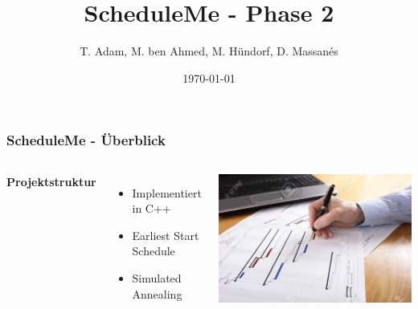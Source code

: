 \documentclass[aspectratio=169]{beamer}
\title[ScheduleMe]{ScheduleMe - Phase 2}
\author{T. Adam, M. ben Ahmed, M. Hündorf, D. Massanés}
\institute[UOS]
{

Universität Osnabrück \\ %

\medskip
\textit{Ressourcenbeschränkte Projektplanung} %


}
\date{\today} %
\begin{document}
\begin{frame}
\titlepage %
\end{frame}


\begin{frame}
	\frametitle{ScheduleMe - Überblick}
	\begin{columns}[c] %
		
		\textbf{Projektstruktur}
		\begin{itemize}
			\item Implementiert in C++
			\item Earliest Start Schedule
			\item Simulated Annealing
		\end{itemize}
		\includegraphics[scale=.5]{../images/stock.jpg}
	\end{columns}
\end{frame}
  
	
\end{document}
